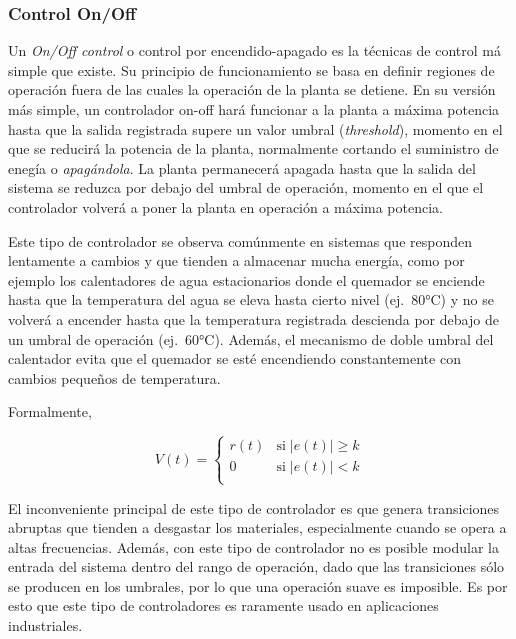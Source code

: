 %
%


\subsubsection{Control On/Off}%
\label{sec:control-onoff}

Un \emph{On/Off control} o control por encendido-apagado es la técnicas de control má simple que existe.
Su principio de funcionamiento se basa en definir regiones de operación fuera de las cuales la operación de la planta se detiene.
En su versión más simple, un controlador on-off hará funcionar a la planta a máxima potencia hasta que la salida registrada supere un valor umbral (\emph{threshold}), momento en el que se reducirá la potencia de la planta, normalmente cortando el suministro de enegía o \emph{apagándola}.
La planta permanecerá apagada hasta que la salida del sistema se reduzca por debajo del umbral de operación, momento en el que el controlador volverá a poner la planta en operación a máxima potencia.

Este tipo de controlador se observa comúnmente en sistemas que responden lentamente a cambios y que tienden a almacenar mucha energía, como por ejemplo los calentadores de agua estacionarios donde el quemador se enciende hasta que la temperatura del agua se eleva hasta cierto nivel (ej.~80°C) y no se volverá a encender hasta que la temperatura registrada descienda por debajo de un umbral de operación (ej.~60°C).
Además, el mecanismo de doble umbral del calentador evita que el quemador se esté encendiendo constantemente con cambios pequeños de temperatura.

Formalmente,

\begin{equation}
V(t) =
	\begin{cases}
	r(t) & \text{si}\; \left\lvert e(t)\right\rvert \geq k\\
	0    & \text{si}\; \left\lvert e(t)\right\rvert < k\\
	\end{cases}
\end{equation}

El inconveniente principal de este tipo de controlador es que genera transiciones abruptas que tienden a desgastar los materiales, especialmente cuando se opera a altas frecuencias.
Además, con este tipo de controlador no es posible modular la entrada del sistema dentro del rango de operación, dado que las transiciones sólo se producen en los umbrales, por lo que una operación suave es imposible.
Es por esto que este tipo de controladores es raramente usado en aplicaciones industriales.
